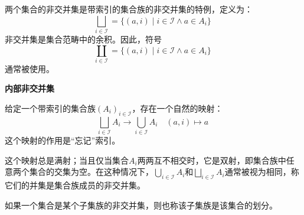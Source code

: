 两个集合的非交并集是带索引的集合族的非交并集的特例，定义为：
\[
\bigsqcup_{i \in \mathcal{I}} = \{(a, i) \mid i \in \mathcal{I} \land a \in A_i\}~
\]
非交并集是集合范畴中的余积。因此，符号
\[
\coprod_{i \in \mathcal{I}} = \{(a, i) \mid i \in \mathcal{I} \land a \in A_i\}~
\]
通常被使用。

\textbf{内部非交并集}

给定一个带索引的集合族\( (A_i)_{i \in \mathcal{I}} \)，存在一个自然的映射：
\[
\bigsqcup_{i \in \mathcal{I}} A_i \to \bigcup_{i \in \mathcal{I}} A_i
\quad (a, i) \mapsto a~
\]
这个映射的作用是“忘记”索引。

这个映射总是满射；当且仅当集合\( A_i \)两两互不相交时，它是双射，即集合族中任意两个集合的交集为空。在这种情况下，\( \bigcup_{i \in \mathcal{I}} A_i \)和\( \bigsqcup_{i \in \mathcal{I}} A_i \)通常被视为相同，称它们的并集是集合族成员的非交并集。

如果一个集合是某个子集族的非交并集，则也称该子集族是该集合的划分。